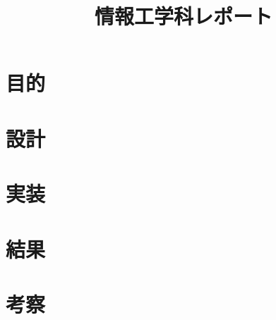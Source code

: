 \documentclass[a4paper]{jsarticle}
\title{情報工学科レポート}
\author{}
\begin{document}
\maketitle
\thispagestyle{empty}
\section{目的}
\section{設計}
\section{実装}
\section{結果}
\section{考察}

\end{document}
